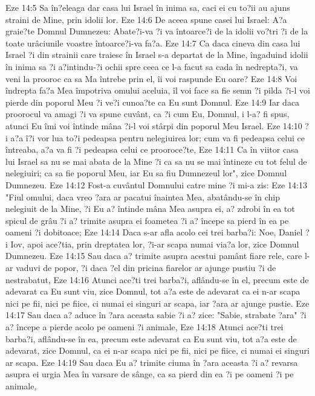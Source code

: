Eze 14:5  Sa în?eleaga dar casa lui Israel în inima sa, caci ei cu to?ii au ajuns straini de Mine, prin idolii lor.
Eze 14:6  De aceea spune casei lui Israel: A?a graie?te Domnul Dumnezeu: Abate?i-va ?i va întoarce?i de la idolii vo?tri ?i de la toate urâciunile voastre întoarce?i-va fa?a.
Eze 14:7  Ca daca cineva din casa lui Israel ?i din strainii care traiesc în Israel s-a departat de la Mine, îngaduind idolii în inima sa ?i a?intindu-?i ochii spre ceea ce l-a facut sa cada în nedrepta?i, va veni la prooroc ca sa Ma întrebe prin el, îi voi raspunde Eu oare?
Eze 14:8  Voi îndrepta fa?a Mea împotriva omului aceluia, îl voi face sa fie semn ?i pilda ?i-l voi pierde din poporul Meu ?i ve?i cunoa?te ca Eu sunt Domnul.
Eze 14:9  Iar daca proorocul va amagi ?i va spune cuvânt, ca ?i cum Eu, Domnul, i l-a? fi spus, atunci Eu îmi voi întinde mâna ?i-l voi stârpi din poporul Meu Israel.
Eze 14:10  ?i a?a î?i vor lua to?i pedeapsa pentru nelegiuirea lor; cum va fi pedeapsa celui ce întreaba, a?a va fi ?i pedeapsa celui ce prooroce?te,
Eze 14:11  Ca în viitor casa lui Israel sa nu se mai abata de la Mine ?i ca sa nu se mai întineze cu tot felul de nelegiuiri; ca sa fie poporul Meu, iar Eu sa fiu Dumnezeul lor", zice Domnul Dumnezeu.
Eze 14:12  Fost-a cuvântul Domnului catre mine ?i mi-a zis:
Eze 14:13  "Fiul omului, daca vreo ?ara ar pacatui înaintea Mea, abatându-se în chip nelegiuit de la Mine, ?i Eu a? întinde mâna Mea asupra ei, a? zdrobi în ea tot spicul de grâu ?i a? trimite asupra ei foametea ?i a? începe sa pierd în ea pe oameni ?i dobitoace;
Eze 14:14  Daca s-ar afla acolo cei trei barba?i: Noe, Daniel ?i Iov, apoi ace?tia, prin dreptatea lor, ?i-ar scapa numai via?a lor, zice Domnul Dumnezeu.
Eze 14:15  Sau daca a? trimite asupra acestui pamânt fiare rele, care l-ar vaduvi de popor, ?i daca ?el din pricina fiarelor ar ajunge pustiu ?i de nestrabatut,
Eze 14:16  Atunci ace?ti trei barba?i, aflându-se în el, precum este de adevarat ca Eu sunt viu, zice Domnul, tot a?a este de adevarat ca ei n-ar scapa nici pe fii, nici pe fiice, ci numai ei singuri ar scapa, iar ?ara ar ajunge pustie.
Eze 14:17  Sau daca a? aduce în ?ara aceasta sabie ?i a? zice: "Sabie, strabate ?ara" ?i a? începe a pierde acolo pe oameni ?i animale,
Eze 14:18  Atunci ace?ti trei barba?i, aflându-se în ea, precum este adevarat ca Eu sunt viu, tot a?a este de adevarat, zice Domnul, ca ei n-ar scapa nici pe fii, nici pe fiice, ci numai ei singuri ar scapa.
Eze 14:19  Sau daca Eu a? trimite ciuma în ?ara aceasta ?i a? revarsa asupra ei urgia Mea în varsare de sânge, ca sa pierd din ea ?i pe oameni ?i pe animale,
